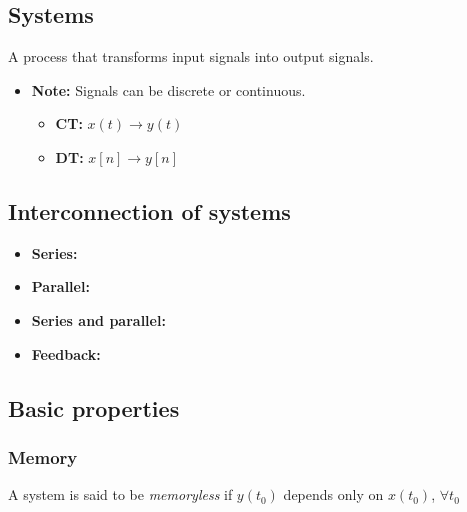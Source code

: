 \subsection{Systems}
\begin{definition}
    A process that transforms input signals into output signals.
    \begin{itemize}
        \item \textbf{Note:} Signals can be discrete or continuous.
        \begin{itemize}
            \item \textbf{CT:} $x(t)\rightarrow y(t)$
            \item \textbf{DT:} $x[n] \rightarrow y[n]$
        \end{itemize} 
    \end{itemize}
\end{definition}

\subsection{Interconnection of systems}
    \begin{definition}
        \begin{itemize}
            \item \textbf{Series:}
            \item \textbf{Parallel:}
            \item \textbf{Series and parallel:}
            \item \textbf{Feedback:}
        \end{itemize}
    \end{definition}

\subsection{Basic properties}
    \subsubsection{Memory}
    \begin{definition}
        A system is said to be \emph{memoryless} if $y(t_0)$ depends only on $x(t_0)$, $\forall t_0$ 
    \end{definition}

